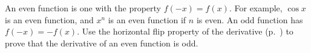 An even function is one with the property $f(-x)=f(x)$. For example, $\cos x$ is an
even function, and $x^n$ is an even function if
$n$ is even. An odd function has $f(-x)=-f(x)$. 
Use the horizontal flip property of the derivative
(p.~\pageref{properties-of-derivative}) to prove that the derivative of an even function is odd.   
